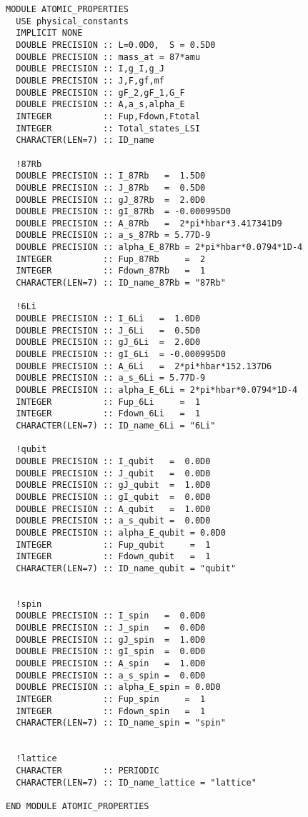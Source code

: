 \documentclass[10pt,a4paper]{article}
\begin{document}
\begin{verbatim}
MODULE ATOMIC_PROPERTIES
  USE physical_constants
  IMPLICIT NONE
  DOUBLE PRECISION :: L=0.0D0,  S = 0.5D0
  DOUBLE PRECISION :: mass_at = 87*amu
  DOUBLE PRECISION :: I,g_I,g_J
  DOUBLE PRECISION :: J,F,gf,mf
  DOUBLE PRECISION :: gF_2,gF_1,G_F
  DOUBLE PRECISION :: A,a_s,alpha_E
  INTEGER          :: Fup,Fdown,Ftotal
  INTEGER          :: Total_states_LSI
  CHARACTER(LEN=7) :: ID_name
  
  !87Rb
  DOUBLE PRECISION :: I_87Rb   =  1.5D0  
  DOUBLE PRECISION :: J_87Rb   =  0.5D0  
  DOUBLE PRECISION :: gJ_87Rb  =  2.0D0
  DOUBLE PRECISION :: gI_87Rb  = -0.000995D0
  DOUBLE PRECISION :: A_87Rb   =  2*pi*hbar*3.417341D9
  DOUBLE PRECISION :: a_s_87Rb = 5.77D-9
  DOUBLE PRECISION :: alpha_E_87Rb = 2*pi*hbar*0.0794*1D-4
  INTEGER          :: Fup_87Rb     =  2
  INTEGER          :: Fdown_87Rb   =  1
  CHARACTER(LEN=7) :: ID_name_87Rb = "87Rb"

  !6Li
  DOUBLE PRECISION :: I_6Li   =  1.0D0  
  DOUBLE PRECISION :: J_6Li   =  0.5D0  
  DOUBLE PRECISION :: gJ_6Li  =  2.0D0
  DOUBLE PRECISION :: gI_6Li  = -0.000995D0
  DOUBLE PRECISION :: A_6Li   =  2*pi*hbar*152.137D6
  DOUBLE PRECISION :: a_s_6Li = 5.77D-9
  DOUBLE PRECISION :: alpha_E_6Li = 2*pi*hbar*0.0794*1D-4
  INTEGER          :: Fup_6Li     =  1
  INTEGER          :: Fdown_6Li   =  1
  CHARACTER(LEN=7) :: ID_name_6Li = "6Li"

  !qubit
  DOUBLE PRECISION :: I_qubit   =  0.0D0
  DOUBLE PRECISION :: J_qubit   =  0.0D0 
  DOUBLE PRECISION :: gJ_qubit  =  1.0D0
  DOUBLE PRECISION :: gI_qubit  =  0.0D0
  DOUBLE PRECISION :: A_qubit   =  1.0D0
  DOUBLE PRECISION :: a_s_qubit =  0.0D0
  DOUBLE PRECISION :: alpha_E_qubit = 0.0D0
  INTEGER          :: Fup_qubit     =  1
  INTEGER          :: Fdown_qubit   =  1
  CHARACTER(LEN=7) :: ID_name_qubit = "qubit"


  !spin
  DOUBLE PRECISION :: I_spin   =  0.0D0
  DOUBLE PRECISION :: J_spin   =  0.0D0
  DOUBLE PRECISION :: gJ_spin  =  1.0D0
  DOUBLE PRECISION :: gI_spin  =  0.0D0
  DOUBLE PRECISION :: A_spin   =  1.0D0
  DOUBLE PRECISION :: a_s_spin =  0.0D0
  DOUBLE PRECISION :: alpha_E_spin = 0.0D0
  INTEGER          :: Fup_spin     =  1
  INTEGER          :: Fdown_spin   =  1
  CHARACTER(LEN=7) :: ID_name_spin = "spin"


  !lattice
  CHARACTER        :: PERIODIC      
  CHARACTER(LEN=7) :: ID_name_lattice = "lattice"
  
END MODULE ATOMIC_PROPERTIES
\end{verbatim}
\end{document}
